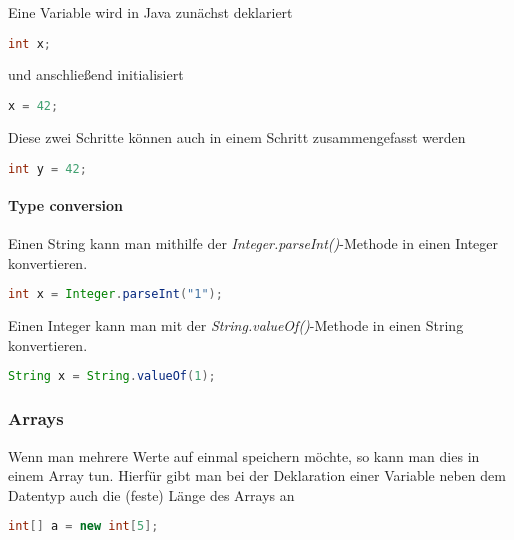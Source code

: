 \documentclass{article}
\begin{document}
	Eine Variable wird in Java zunächst deklariert

	\begin{lstlisting}[language=Java, caption=Deklarierung einer Variable in Java]
		int x;
	\end{lstlisting}

	und anschließend initialisiert

	\begin{lstlisting}[language=Java, caption=Initialisierung einer Variable in Java]
		x = 42;
	\end{lstlisting}

	Diese zwei Schritte können auch in einem Schritt zusammengefasst werden

	\begin{lstlisting}[language=Java, caption=Deklarierung und Initialisierung einer Variable]
		int y = 42;
	\end{lstlisting}

	\paragraph{Type conversion}
	Einen String kann man mithilfe der \textit{Integer.parseInt()}-Methode in einen Integer konvertieren.

	\begin{lstlisting}[language=Java, caption=String-zu-Integer-Konvertierung]
		int x = Integer.parseInt("1");
	\end{lstlisting}

	Einen Integer kann man mit der \textit{String.valueOf()}-Methode in einen String konvertieren.

	\begin{lstlisting}[language=Java, caption=Integer-zu-String-Konvertierung]
		String x = String.valueOf(1);
	\end{lstlisting}

	\subsubsection{Arrays}
	Wenn man mehrere Werte auf einmal speichern möchte, so kann man dies in einem Array tun. Hierfür gibt man bei der Deklaration einer Variable neben dem Datentyp auch die (feste) Länge des Arrays an
	
	\begin{lstlisting}[language=Java, caption=Deklarierung eines Integer-Arrays mit 5 Feldern] 
		int[] a = new int[5];
	\end{lstlisting}
\end{document}
